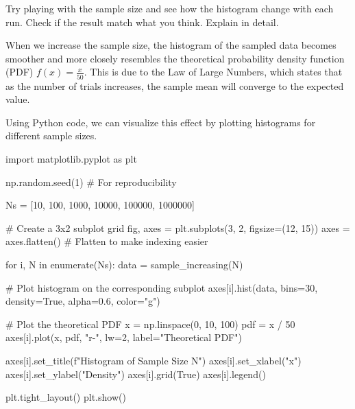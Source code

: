 \documentclass[a4paper, 10pt]{article}
\begin{document}
\newpage

\begin{problem}[0]
Try playing with the sample size and see how the histogram change with each run.
Check if the result match what you think. Explain in detail.
\end{problem}

\begin{solution}
When we increase the sample size, the histogram of the sampled data becomes smoother
and more closely resembles the theoretical probability density function (PDF) \( f(x) = \frac{x}{50} \).
This is due to the Law of Large Numbers, which states that as the number of trials increases,
the sample mean will converge to the expected value.

Using Python code, we can visualize this effect by plotting histograms for different sample sizes.
\begin{codingbox}
import matplotlib.pyplot as plt

np.random.seed(1)  # For reproducibility

Ns = [10, 100, 1000, 10000, 100000, 1000000]

# Create a 3x2 subplot grid
fig, axes = plt.subplots(3, 2, figsize=(12, 15))
axes = axes.flatten()  # Flatten to make indexing easier

for i, N in enumerate(Ns):
    data = sample_increasing(N)
    
    # Plot histogram on the corresponding subplot
    axes[i].hist(data, bins=30, density=True, alpha=0.6, color="g")

    # Plot the theoretical PDF
    x = np.linspace(0, 10, 100)
    pdf = x / 50
    axes[i].plot(x, pdf, "r-", lw=2, label="Theoretical PDF")

    axes[i].set_title(f"Histogram of Sample Size {N}")
    axes[i].set_xlabel("x")
    axes[i].set_ylabel("Density")
    axes[i].grid(True)
    axes[i].legend()

plt.tight_layout()
plt.show()
\end{codingbox}

\newpage


\end{solution}
\end{document}
